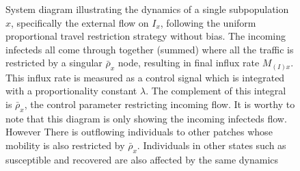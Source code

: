 \begin{figure}[ht]
    \centering
    \caption{System diagram illustrating the dynamics of a single subpopulation $x$, specifically the external flow on $I_x$, following the uniform proportional travel restriction strategy without bias. The incoming infecteds all come through together (summed) where all the traffic is restricted by a singular $\bar \rho_x$ node, resulting in final influx rate $M_{(I)x}$. This influx rate is measured as a control signal which is integrated with a proportionality constant $\lambda$. The complement of this integral is $\bar \rho_x$, the control parameter restricting incoming flow.    It is worthy to note that this diagram is only showing the incoming infecteds flow. However There is outflowing individuals to other patches whose mobility is also restricted by $\bar \rho_x$. Individuals in other states such as susceptible and recovered are also affected by the same dynamics }
    \label{fig:Unifrom restriction diagram}
\end{figure}

